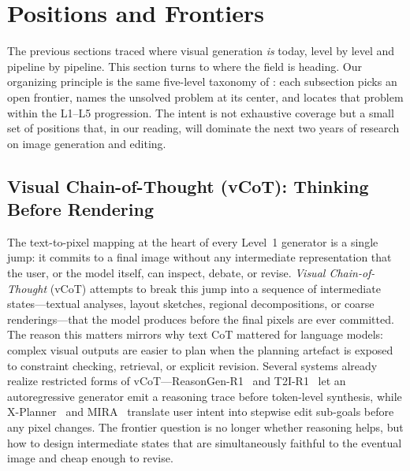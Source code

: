 \section{Positions and Frontiers}
\label{sec:frontier}

The previous sections traced where visual generation \emph{is} today, level by level and pipeline by pipeline. This section turns to where the field is heading. Our organizing principle is the same five-level taxonomy of : each subsection picks an open frontier, names the unsolved problem at its center, and locates that problem within the L1--L5 progression. The intent is not exhaustive coverage but a small set of positions that, in our reading, will dominate the next two years of research on image generation and editing.

\subsection{Visual Chain-of-Thought (vCoT): Thinking Before Rendering}
\label{subsec:vcot}

The text-to-pixel mapping at the heart of every Level~1 generator is a single jump: it commits to a final image without any intermediate representation that the user, or the model itself, can inspect, debate, or revise. \emph{Visual Chain-of-Thought} (vCoT) attempts to break this jump into a sequence of intermediate states---textual analyses, layout sketches, regional decompositions, or coarse renderings---that the model produces before the final pixels are ever committed. The reason this matters mirrors why text CoT mattered for language models: complex visual outputs are easier to plan when the planning artefact is exposed to constraint checking, retrieval, or explicit revision. Several systems already realize restricted forms of vCoT---ReasonGen-R1~\citep{zhang2025reasongen} and T2I-R1~\citep{jiang2025t2i} let an autoregressive generator emit a reasoning trace before token-level synthesis, while X-Planner~\citep{Yeh2025BeyondSE} and MIRA~\citep{Zeng2025MIRAMI} translate user intent into stepwise edit sub-goals before any pixel changes. The frontier question is no longer whether reasoning helps, but how to design intermediate states that are simultaneously faithful to the eventual image and cheap enough to revise.

